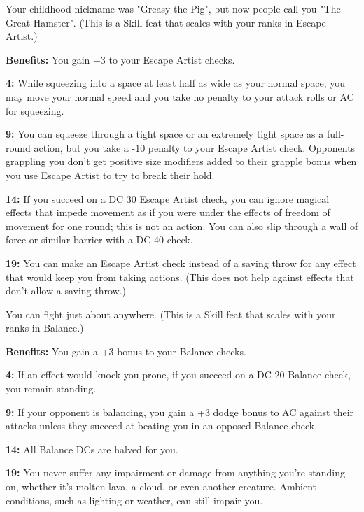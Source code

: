 
Your childhood nickname was "Greasy the Pig", but now people call you "The Great Hamster". (This is a Skill feat that scales with your ranks in Escape Artist.)

\textbf{Benefits:} You gain +3 to your Escape Artist checks.

\textbf{4:} While squeezing into a space at least half as wide as your normal space, you may move your normal speed and you take no penalty to your attack rolls or AC for squeezing.

\textbf{9:} You can squeeze through a tight space or an extremely tight space as a full-round action, but you take a -10 penalty to your Escape Artist check. Opponents grappling you don't get positive size modifiers added to their grapple bonus when you use Escape Artist to try to break their hold.

\textbf{14:} If you succeed on a DC 30 Escape Artist check, you can ignore magical effects that impede movement as if you were under the effects of freedom of movement for one round; this is not an action. You can also slip through a wall of force or similar barrier with a DC 40 check.

\textbf{19:} You can make an Escape Artist check instead of a saving throw for any effect that would keep you from taking actions. (This does not help against effects that don't allow a saving throw.)


You can fight just about anywhere. (This is a Skill feat that scales with your ranks in Balance.)

\textbf{Benefits:} You gain a +3 bonus to your Balance checks.

\textbf{4:} If an effect would knock you prone, if you succeed on a DC 20 Balance check, you remain standing.

\textbf{9:} If your opponent is balancing, you gain a +3 dodge bonus to AC against their attacks unless they succeed at beating you in an opposed Balance check.

\textbf{14:} All Balance DCs are halved for you.

\textbf{19:} You never suffer any impairment or damage from anything you're standing on, whether it's molten lava, a cloud, or even another creature. Ambient conditions, such as lighting or weather, can still impair you.


